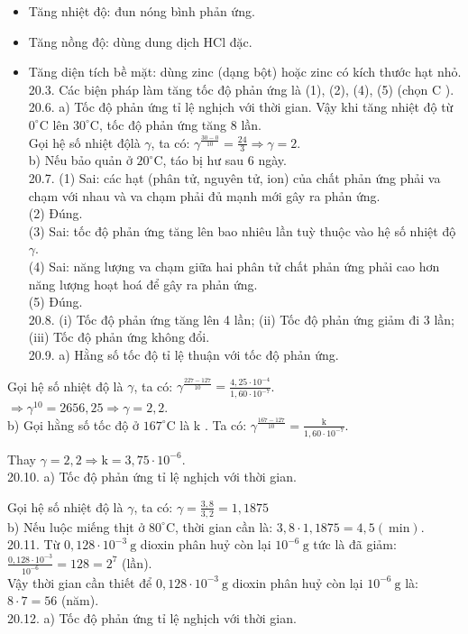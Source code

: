 \documentclass[10pt]{article}
\begin{document}
\begin{itemize}
  \item Tăng nhiệt độ: đun nóng bình phản ứng.
  \item Tăng nồng độ: dùng dung dịch HCl đặc.
  \item Tăng diện tích bề mặt: dùng zinc (dạng bột) hoặc zinc có kích thước hạt nhỏ.\\
20.3. Các biện pháp làm tăng tốc độ phản ứng là (1), (2), (4), (5) (chọn C ).\\
20.6. a) Tốc độ phản ứng tỉ lệ nghịch với thời gian. Vậy khi tăng nhiệt độ từ $0^{\circ} \mathrm{C}$ lên $30^{\circ} \mathrm{C}$, tốc độ phản ứng tăng 8 lần.\\
Gọi hệ số nhiệt độlà $\gamma$, ta có: $\gamma^{\frac{30-0}{10}}=\frac{24}{3} \Rightarrow \gamma=2$.\\
b) Nếu bảo quản ở $20^{\circ} \mathrm{C}$, táo bị hư sau 6 ngày.\\
20.7. (1) Sai: các hạt (phân tử, nguyên tử, ion) của chất phản ứng phải va chạm với nhau và va chạm phải đủ mạnh mới gây ra phản ứng.\\
(2) Đúng.\\
(3) Sai: tốc độ phản ứng tăng lên bao nhiêu lần tuỳ thuộc vào hệ số nhiệt độ $\gamma$.\\
(4) Sai: năng lượng va chạm giữa hai phân tử chất phản ứng phải cao hơn năng lượng hoạt hoá để gây ra phản ứng.\\
(5) Đúng.\\
20.8. (i) Tốc độ phản ứng tăng lên 4 lần; (ii) Tốc độ phản ứng giảm đi 3 lần; (iii) Tốc độ phản ứng không đổi.\\
20.9. a) Hằng số tốc độ tỉ lệ thuận với tốc độ phản ứng.
\end{itemize}

Gọi hệ số nhiệt độ là $\gamma$, ta có: $\gamma^{\frac{227-127}{10}}=\frac{4,25 \cdot 10^{-4}}{1,60 \cdot 10^{-7}}$.\\
$\Rightarrow \gamma^{10}=2656,25 \Rightarrow \gamma=2,2$.\\
b) Gọi hằng số tốc độ ở $167^{\circ} \mathrm{C}$ là k . Ta có: $\gamma^{\frac{167-127}{10}}=\frac{\mathrm{k}}{1,60 \cdot 10^{-7}}$.

Thay $\gamma=2,2 \Rightarrow \mathrm{k}=3,75 \cdot 10^{-6}$.\\
20.10. a) Tốc độ phản ứng tỉ lệ nghịch với thời gian.

Gọi hệ số nhiệt độ là $\gamma$, ta có: $\gamma=\frac{3,8}{3,2}=1,1875$\\
b) Nếu luộc miếng thịt ở $80^{\circ} \mathrm{C}$, thời gian cần là: $3,8 \cdot 1,1875=4,5(\mathrm{~min})$.\\
20.11. Từ $0,128 \cdot 10^{-3} \mathrm{~g}$ dioxin phân huỷ còn lại $10^{-6} \mathrm{~g}$ tức là đã giảm:\\
$\frac{0,128 \cdot 10^{-3}}{10^{-6}}=128=2^{7}$ (lần).\\
Vậy thời gian cần thiết để $0,128 \cdot 10^{-3} \mathrm{~g}$ dioxin phân huỷ còn lại $10^{-6} \mathrm{~g}$ là:\\
$8 \cdot 7=56$ (năm).\\
20.12. a) Tốc độ phản ứng tỉ lệ nghịch với thời gian.
\end{document}
